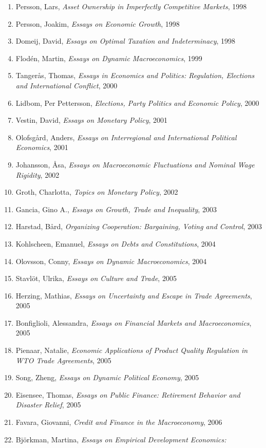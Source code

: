 \begin{spacing}{.5}
\begin{enumerate}
\item Persson, Lars,\emph{ Asset Ownership in Imperfectly Competitive Markets},
1998
\item Persson, Joakim,\emph{ Essays on Economic Growth}, 1998
\item Domeij, David,\emph{ Essays on Optimal Taxation and Indeterminacy},
1998
\item Flod\'en, Martin, \emph{Essays on Dynamic Macroeconomics}, 1999
\item Tanger\aa s, Thomas,\emph{ Essays in Economics and Politics: Regulation,
Elections and International Conflict}, 2000
\item Lidbom, Per Pettersson,\emph{ Elections, Party Politics and Economic
Policy}, 2000
\item Vestin, David,\emph{ Essays on Monetary Policy}, 2001
\item Olofsg\aa rd, Anders,\emph{ Essays on Interregional and International
Political Economics}, 2001
\item Johansson, \AA sa,\emph{ Essays on Macroeconomic Fluctuations and Nominal
Wage Rigidity}, 2002
\item Groth, Charlotta,\emph{ Topics on Monetary Policy}, 2002
\item Gancia, Gino A.,\emph{ Essays on Growth, Trade and Inequality}, 2003
\item Harstad, B\aa rd,\emph{ Organizing Cooperation: Bargaining, Voting and
Control}, 2003
\item Kohlscheen, Emanuel,\emph{ Essays on Debts and Constitutions}, 2004
\item Olovsson, Conny, \emph{Essays on Dynamic Macroeconomics}, 2004
\item Stavl\"ot, Ulrika,\emph{ Essays on Culture and Trade}, 2005
\item Herzing, Mathias,\emph{ Essays on Uncertainty and Escape in Trade
Agreements}, 2005
\item Bonfiglioli, Alessandra,\emph{ Essays on Financial Markets and 
Macroeconomics},
2005
\item Pienaar, Natalie,\emph{ Economic Applications of Product Quality 
Regulation
in WTO Trade Agreements}, 2005
\item Song, Zheng,\emph{ Essays on Dynamic Political Economy}, 2005
\item Eisensee, Thomas,\emph{ Essays on Public Finance: Retirement Behavior
and Disaster Relief}, 2005
\item Favara, Giovanni,\emph{ Credit and Finance in the Macroeconomy}, 2006
\item Bj\"orkman, Martina,\emph{ Essays on Empirical Development Economics:
}
\end{enumerate}
\end{spacing}
